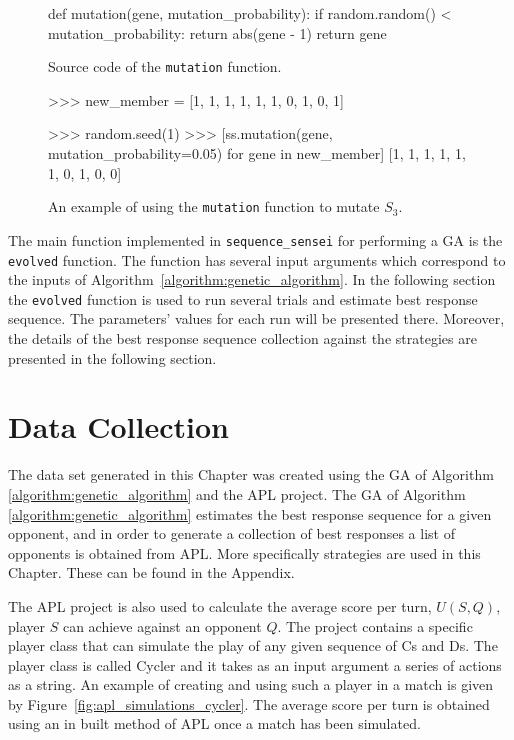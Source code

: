 \begin{figure}[!htbp]
    \begin{sourcepy}
def mutation(gene, mutation_probability):
    if random.random() < mutation_probability:
        return abs(gene - 1)
    return gene
\end{sourcepy}
\caption{Source code of the \texttt{mutation} function.}\label{fig:mutation_implementation}
\end{figure}

\begin{figure}[!htbp]
    \begin{usagepy}
>>> new_member = [1, 1, 1, 1, 1, 1, 0, 1, 0, 1]

>>> random.seed(1)
>>> [ss.mutation(gene, mutation_probability=0.05) for gene in new_member]
[1, 1, 1, 1, 1, 1, 0, 1, 0, 0]

\end{usagepy}
\caption{An example of using the \texttt{mutation} function to mutate
\(S_3\).}\label{fig:mutation_usage}
\end{figure}

The main function implemented in \texttt{sequence_sensei} for
performing a GA is the \texttt{evolved} function. The function has
several input arguments which correspond to the inputs of
Algorithm~\ref{algorithm:genetic_algorithm}. In the following section the
\texttt{evolved} function is used to run several trials and estimate
best response sequence. The parameters' values for each run will be presented there.
Moreover, the details of the best response sequence collection against the
\numberofstrategiesbestsequences strategies are presented in the following section.

\section{Data Collection}\label{section:generating_sequences}

The data set generated in this Chapter was created using the GA of Algorithm
\ref{algorithm:genetic_algorithm} and the APL project. The GA of Algorithm
\ref{algorithm:genetic_algorithm} estimates the best response sequence for a given
opponent, and in order to generate a collection of best responses a list of
opponents is obtained from APL. More specifically \numberofstrategiesbestsequences strategies are used
in this Chapter. These can be found in the Appendix.

The APL project is also used to calculate the average score per turn, \(U(S, Q)\),
player \(S\) can achieve against an opponent \(Q\). The project contains a specific
player
class that can simulate the play of any given sequence of Cs and Ds. The player class
is called Cycler and it takes as an input argument a series of actions as a
string.
An example of creating and using such a player in a match is given by
Figure~\ref{fig:apl_simulations_cycler}. The average score per turn is obtained
using an in built method of APL once a match has been simulated.

